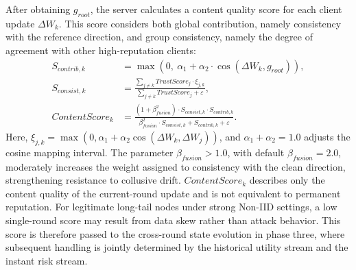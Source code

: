 \documentclass[final,5p,times,twocolumn]{elsarticle/elsarticle}
\begin{document}
After obtaining $g_{root}$, the server calculates a content quality score for each client update $\Delta W_k$. This score considers both global contribution, namely consistency with the reference direction, and group consistency, namely the degree of agreement with other high-reputation clients:
\begin{align}
    S_{contrib,k}    & = \max\left(0,\ \alpha_{1} + \alpha_{2} \cdot \cos(\Delta W_{k}, g_{root})\right),                                                              \\
    S_{consist,k}    & = \frac{\sum_{j\neq k} TrustScore_{j} \cdot \xi_{j,k}}{\sum_{j\neq k} TrustScore_{j} + \varepsilon},                                            \\
    ContentScore_{k} & = \frac{(1 + \beta_{fusion}^{2}) \cdot S_{consist,k} \cdot S_{contrib,k}}{\beta_{fusion}^{2}\cdot S_{consist,k} + S_{contrib,k} + \varepsilon}.
\end{align}
Here, $\xi_{j,k}=\max(0,\alpha_1+\alpha_2\cos(\Delta W_k,\Delta W_j))$, and $\alpha_1+\alpha_2=1.0$ adjusts the cosine mapping interval. The parameter $\beta_{fusion}>1.0$, with default $\beta_{fusion}=2.0$, moderately increases the weight assigned to consistency with the clean direction, strengthening resistance to collusive drift. $ContentScore_k$ describes only the content quality of the current-round update and is not equivalent to permanent reputation. For legitimate long-tail nodes under strong Non-IID settings, a low single-round score may result from data skew rather than attack behavior. This score is therefore passed to the cross-round state evolution in phase three, where subsequent handling is jointly determined by the historical utility stream and the instant risk stream.
\end{document}
